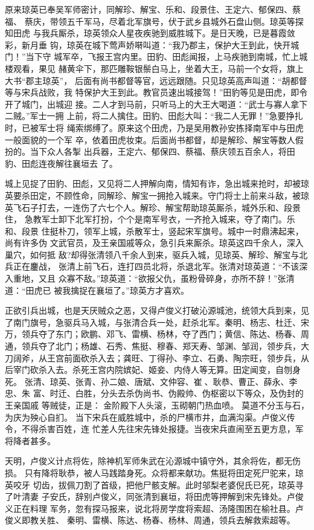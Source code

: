 原来琼英已奉吴军师密计，同解珍、解宝、乐和、段景住、王定六、郁保四、蔡福、
蔡庆，带领五千军马，尽着北军旗号，伏于武乡县城外石盘山侧。琼英等探知田虎
与我兵厮杀，琼英领众人星夜疾驰到威胜城下。是日天晚，已是暮霞敛彩，新月垂
钩，琼英在城下莺声娇啭叫道：“我乃郡主，保护大王到此，快开城门！”当下守
城军卒，飞报王宫内里。田豹、田彪闻报，上马疾驰到南城，忙上城楼观看，果见
赭黄伞下，那匹雕鞍银鬃白马上，坐着大王，马前一个女将，旗上大书“郡主琼英”，
后面有尚书都督等官，远远跟随。只见琼英高声叫道：“胡都督等与宋兵战败，我
特保护大王到此。教官员速出城接驾！”田豹等见是田虎，即令开了城门，出城迎
接。二人才到马前，只听马上的大王大喝道：“武士与寡人拿下二贼。”军士一拥
上前，将二人擒住。田豹、田彪大叫：“我二人无罪！”急要挣扎时，已被军士将
绳索绑缚了。原来这个田虎，乃是吴用教孙安拣择南军中与田虎一般面貌的一个军
卒，依着田虎妆束。后面尚书都督，却是解珍、解宝等数人假扮的。当下众人各掣
出兵器，王定六、郁保四、蔡福、蔡庆领五百余人，将田豹、田彪连夜解往襄垣去
了。

城上见捉了田豹、田彪，又见将二人押解向南，情知有诈，急出城来抢时，却被琼
英要杀田定，不顾性命，同解珍、解宝一拥抢入城来。守门将士上前来斗敌，被琼
英飞石子打去，一连伤了六七个人。解珍、解宝帮助琼英厮杀，城外乐和、段景住，
急教军士卸下北军打扮，个个是南军号衣，一齐抢入城来，夺了南门。乐和、段景
住挺朴刀，领军上城，杀散军士，竖起宋军旗号。城中一时鼎沸起来，尚有许多伪
文武官员，及王亲国戚等众，急引兵来厮杀。琼英这四千余人，深入巢穴，如何抵
敌?却得张清领八千余人到来，驱兵入城，见琼英、解珍、解宝与北兵正在鏖战，
张清上前飞石，连打四员北将，杀退北军。张清对琼英道：“不该深入重地，又且
众寡不敌。”琼英道：“欲报父仇，虽粉骨碎身，亦所不辞！”张清道：“田虎已
被我擒捉在襄垣了。”琼英方才喜欢。

正欲引兵出城，也是天厌贼众之恶，又得卢俊义打破沁源城池，统领大兵到来，见
了南门旗号，急驱兵马入城，与张清合兵一处，赶杀北军。秦明、杨志、杜迁、宋
万，领兵夺了东门；欧鹏、邓飞、雷横、杨林，夺了西门；黄信、陈达、杨春、周
通，领兵夺了北门；杨雄、石秀、焦挺、穆春、郑天寿、邹渊、邹润，领步兵，大
刀阔斧，从王宫前面砍杀入去；龚旺、丁得孙、李立、石勇、陶宗旺，领步兵，从
后宰门砍杀入去。杀死王宫内院嫔妃、姬妾、内侍人等无算。田定闻变，自刎身死。
张清、琼英、张青、孙二娘、唐斌、文仲容、崔、耿恭、曹正、薛永、李忠、朱
富、时迁、白胜，分头去杀伪尚书、伪殿帅、伪枢密以下等众，及伪封的王亲国戚
等贼徒，正是：
金阶殿下人头滚，玉砌朝门热血喷。
莫道不分玉与石，为庆为殃心自扪。
当下宋兵在威胜城中，杀的尸横市井，血满沟渠。卢俊义传令，不得杀害百姓，连
忙差人先往宋先锋处报捷。当夜宋兵直闹至五更方息，军将降者甚多。

天明，卢俊义计点将佐，除神机军师朱武在沁源城中镇守外，其余将佐，都无伤损。
只有降将耿恭，被人马践踏身死。众将都来献功。焦挺将田定死尸驼来，琼英咬牙
切齿，拔佩刀割了首级，把他尸骸支解。此时邬梨老婆倪氏已死，琼英寻了叶清妻
子安氏，辞别卢俊义，同张清到襄垣，将田虎等押解到宋先锋处。卢俊义正在料理
军务，忽有探马报来，说北将房学度将索超、汤隆围困在榆社县。卢俊义即教关胜、
秦明、雷横、陈达、杨春、杨林、周通，领兵去解救索超等。

